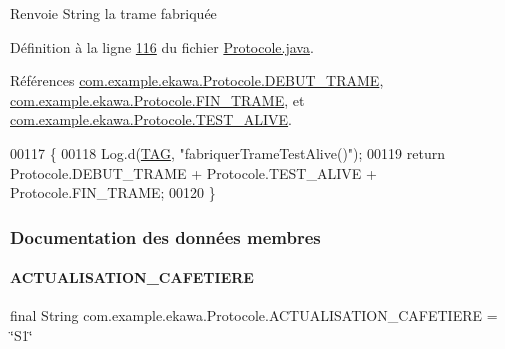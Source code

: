 \begin{DoxyReturn}{Renvoie}
String la trame fabriquée 
\end{DoxyReturn}


Définition à la ligne \hyperlink{_protocole_8java_source_l00116}{116} du fichier \hyperlink{_protocole_8java_source}{Protocole.\+java}.



Références \hyperlink{_protocole_8java_source_l00025}{com.\+example.\+ekawa.\+Protocole.\+D\+E\+B\+U\+T\+\_\+\+T\+R\+A\+ME}, \hyperlink{_protocole_8java_source_l00026}{com.\+example.\+ekawa.\+Protocole.\+F\+I\+N\+\_\+\+T\+R\+A\+ME}, et \hyperlink{_protocole_8java_source_l00029}{com.\+example.\+ekawa.\+Protocole.\+T\+E\+S\+T\+\_\+\+A\+L\+I\+VE}.


\begin{DoxyCode}
00117     \{
00118         Log.d(\hyperlink{classcom_1_1example_1_1ekawa_1_1_protocole_ae9b68fa0daac528421b887f19413f8f5}{TAG}, \textcolor{stringliteral}{"fabriquerTrameTestAlive()"});
00119         \textcolor{keywordflow}{return} Protocole.DEBUT\_TRAME + Protocole.TEST\_ALIVE + Protocole.FIN\_TRAME;
00120     \}
\end{DoxyCode}


\subsubsection{Documentation des données membres}
\mbox{\label{classcom_1_1example_1_1ekawa_1_1_protocole_ab35c00ac601a9f2037ba8c95d9c09983}} 
\paragraph{\texorpdfstring{A\+C\+T\+U\+A\+L\+I\+S\+A\+T\+I\+O\+N\+\_\+\+C\+A\+F\+E\+T\+I\+E\+RE}{ACTUALISATION\_CAFETIERE}}
{\footnotesize\ttfamily final String com.\+example.\+ekawa.\+Protocole.\+A\+C\+T\+U\+A\+L\+I\+S\+A\+T\+I\+O\+N\+\_\+\+C\+A\+F\+E\+T\+I\+E\+RE = \char`\"{}S1\char`\"{}\hspace{0.3cm}{\ttfamily [static]}}



